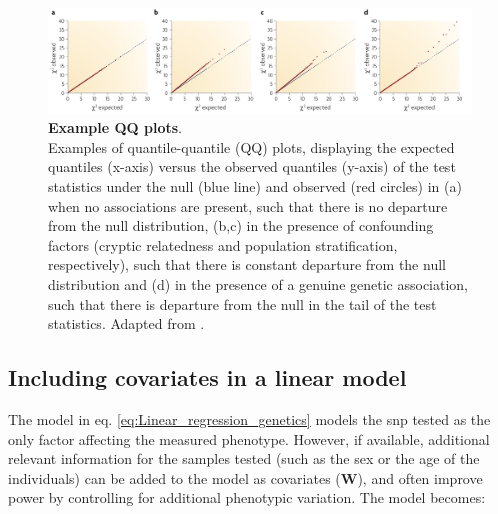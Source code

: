 \begin{figure}[h]
\centering
\includegraphics[width=15cm]{Chapter2/Fig/qqplots.png}
\caption[QQ plots]{\textbf{Example QQ plots}.\\
Examples of quantile-quantile (QQ) plots, displaying the expected quantiles (x-axis) versus the observed quantiles (y-axis) of the test statistics under the null (blue line) and observed (red circles) in (a) when no associations are present, such that there is no departure from the null distribution,  (b,c) in the presence of confounding factors (cryptic relatedness and population stratification, respectively), such that there is constant departure from the null distribution and (d) in the presence of a genuine genetic association, such that there is departure from the null in the tail of the test statistics.
Adapted from 
\cite{mccarthy2008genome}.
}
\label{fig:qqplots}
\end{figure}



\subsection{Including covariates in a linear model}
\label{sec:confounders}

The model in eq. \eqref{eq:Linear_regression_genetics} models the \gls{snp} tested as the only factor affecting the measured phenotype.
However, if available, additional relevant information for the samples tested (such as the sex or the age of the individuals) can be added to the model as covariates ($\mathbf{W}$), and often improve power by controlling for additional phenotypic variation. 
The model becomes:

